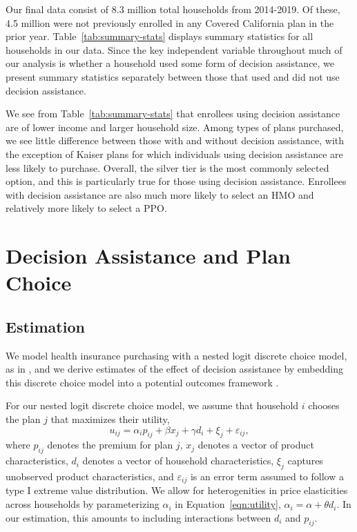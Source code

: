 \documentclass[12pt]{article}
\begin{document}
Our final data consist of 8.3 million total households from 2014-2019. Of these, 4.5 million were not previously enrolled in any Covered California plan in the prior year. Table~\ref{tab:summary-stats} displays summary statistics for all households in our data. Since the key independent variable throughout much of our analysis is whether a household used some form of decision assistance, we present summary statistics separately between those that used and did not use decision assistance. 

We see from Table~\ref{tab:summary-stats} that enrollees using decision assistance are of lower income and larger household size. Among types of plans purchased, we see little difference between those with and without decision assistance, with the exception of Kaiser plans for which individuals using decision assistance are less likely to purchase. Overall, the silver tier is the most commonly selected option, and this is particularly true for those using decision assistance. Enrollees with decision assistance are also much more likely to select an HMO and relatively more likely to select a PPO.


\section{Decision Assistance and Plan Choice}
\label{sec:causal}

\subsection{Estimation}
\label{subsec:causal-methods}
We model health insurance purchasing with a nested logit discrete choice model, as in \cite{saltzman2019}, and we derive estimates of the effect of decision assistance by embedding this discrete choice model into a potential outcomes framework \citep{rubin1974, imbens2009}.

For our nested logit discrete choice model, we assume that household $i$ chooses the plan $j$ that maximizes their utility,
\begin{equation}
u_{ij} = \alpha_{i}p_{ij} + \beta x_{j} + \gamma d_{i} + \xi_{j} + \varepsilon_{ij}, 
\label{eqn:utility}
\end{equation}
where $p_{ij}$ denotes the premium for plan $j$, $x_{j}$ denotes a vector of product characteristics, $d_{i}$ denotes a vector of household characteristics, $\xi_{j}$ captures unobserved product characteristics, and $\varepsilon_{ij}$ is an error term assumed to follow a type I extreme value distribution. We allow for heterogenities in price elasticities across households by parameterizing $\alpha_{i}$ in Equation~\eqref{eqn:utility}, $\alpha_{i} = \alpha + \theta d_{i}.$ In our estimation, this amounts to including interactions between $d_{i}$ and $p_{ij}$.
\end{document}
